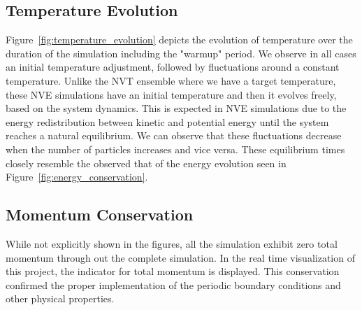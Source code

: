 \subsection{Temperature Evolution}
Figure~\ref{fig:temperature_evolution} depicts the evolution of temperature over the duration of the simulation including the "warmup" period.
We observe in all cases an initial temperature adjustment, followed by fluctuations 
around a constant temperature. Unlike the NVT ensemble where we have a target temperature, these NVE simulations have an initial temperature and then it evolves freely, based on the system dynamics. This is expected in NVE simulations due to the energy redistribution between kinetic and potential energy until the system reaches a natural equilibrium. We can observe that these fluctuations decrease when the number of particles increases and vice versa. These equilibrium times closely resemble the observed that of the energy evolution seen in Figure~\ref{fig:energy_conservation}.

\subsection{Momentum Conservation}
While not explicitly shown in the figures, all the simulation exhibit zero total momentum through out the complete simulation. In the real time visualization of this project, the indicator for total momentum is displayed. This conservation confirmed the proper implementation of the periodic boundary conditions and other physical properties.


